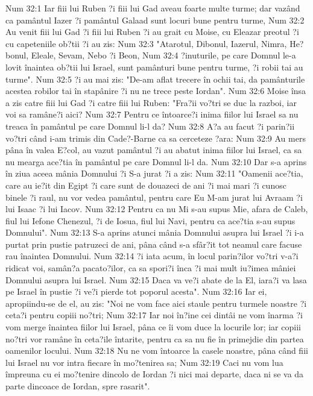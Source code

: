 Num 32:1  Iar fiii lui Ruben ?i fiii lui Gad aveau foarte multe turme; dar vazând ca pamântul Iazer ?i pamântul Galaad sunt locuri bune pentru turme,
Num 32:2  Au venit fiii lui Gad ?i fiii lui Ruben ?i au grait cu Moise, cu Eleazar preotul ?i cu capeteniile ob?tii ?i au zis:
Num 32:3  "Atarotul, Dibonul, Iazerul, Nimra, He?bonul, Eleale, Sevam, Nebo ?i Beon,
Num 32:4  ?inuturile, pe care Domnul le-a lovit înaintea ob?tii lui Israel, sunt pamânturi bune pentru turme, ?i robii tai au turme".
Num 32:5  ?i au mai zis: "De-am aflat trecere în ochii tai, da pamânturile acestea robilor tai în stapânire ?i nu ne trece peste Iordan".
Num 32:6  Moise însa a zis catre fiii lui Gad ?i catre fiii lui Ruben: "Fra?ii vo?tri se duc la razboi, iar voi sa ramâne?i aici?
Num 32:7  Pentru ce întoarce?i inima fiilor lui Israel sa nu treaca în pamântul pe care Domnul li-l da?
Num 32:8  A?a au facut ?i parin?ii vo?tri când i-am trimis din Cade?-Barne ca sa cerceteze ?ara:
Num 32:9  Au mers pâna în valea E?col, au vazut pamântul ?i au abatut inima fiilor lui Israel, ca sa nu mearga ace?tia în pamântul pe care Domnul li-l da.
Num 32:10  Dar s-a aprins în ziua aceea mânia Domnului ?i S-a jurat ?i a zis:
Num 32:11  "Oamenii ace?tia, care au ie?it din Egipt ?i care sunt de douazeci de ani ?i mai mari ?i cunosc binele ?i raul, nu vor vedea pamântul, pentru care Eu M-am jurat lui Avraam ?i lui Isaac ?i lui Iacov.
Num 32:12  Pentru ca nu Mi s-au supus Mie, afara de Caleb, fiul lui Iefone Chenezul, ?i de Iosua, fiul lui Navi, pentru ca ace?tia s-au supus Domnului".
Num 32:13  S-a aprins atunci mânia Domnului asupra lui Israel ?i i-a purtat prin pustie patruzeci de ani, pâna când s-a sfâr?it tot neamul care facuse rau înaintea Domnului.
Num 32:14  ?i iata acum, în locul parin?ilor vo?tri v-a?i ridicat voi, samân?a pacato?ilor, ca sa spori?i înca ?i mai mult iu?imea mâniei Domnului asupra lui Israel.
Num 32:15  Daca va ve?i abate de la El, iara?i va lasa pe Israel în pustie ?i ve?i pierde tot poporul acesta".
Num 32:16  Iar ei, apropiindu-se de el, au zis: "Noi ne vom face aici staule pentru turmele noastre ?i ceta?i pentru copiii no?tri;
Num 32:17  Iar noi în?ine cei dintâi ne vom înarma ?i vom merge înaintea fiilor lui Israel, pâna ce îi vom duce la locurile lor; iar copiii no?tri vor ramâne în ceta?ile întarite, pentru ca sa nu fie în primejdie din partea oamenilor locului.
Num 32:18  Nu ne vom întoarce la casele noastre, pâna când fiii lui Israel nu vor intra fiecare în mo?tenirea sa;
Num 32:19  Caci nu vom lua împreuna cu ei mo?tenire dincolo de Iordan ?i nici mai departe, daca ni se va da parte dincoace de Iordan, spre rasarit".
